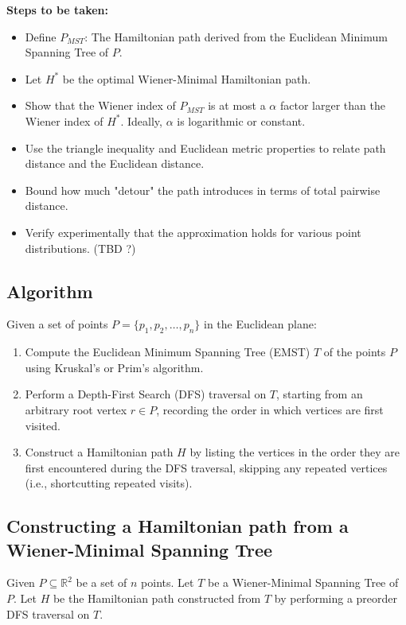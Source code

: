 \documentclass{article}
\begin{document}
\textbf{Steps to be taken:}
\begin{itemize}
	\item Define $P_{MST}$: The Hamiltonian path derived from the Euclidean Minimum Spanning Tree of $P$.
	\item Let $H^*$ be the optimal Wiener-Minimal Hamiltonian path.
	\item Show that the Wiener index of $P_{MST}$ is at most a $\alpha$ factor larger than the Wiener index of $H^*$. Ideally, $\alpha$ is logarithmic or constant.
	\item Use the triangle inequality and Euclidean metric properties to relate path distance and the Euclidean distance.
	\item Bound how much "detour" the path introduces in terms of total pairwise distance.
	\item Verify experimentally that the approximation holds for various point distributions. (TBD ?)
\end{itemize}


\subsection*{Algorithm}

Given a set of points \(P = \{p_1, p_2, \dots, p_n\}\) in the Euclidean plane:

\begin{enumerate}
	\item Compute the Euclidean Minimum Spanning Tree (EMST) \(T\) of the points \(P\) using Kruskal's or Prim's algorithm.
	\item Perform a Depth-First Search (DFS) traversal on \(T\), starting from an arbitrary root vertex \(r \in P\), recording the order in which vertices are first visited.
	\item Construct a Hamiltonian path \(H\) by listing the vertices in the order they are first encountered during the DFS traversal, skipping any repeated vertices (i.e., shortcutting repeated visits).
\end{enumerate}

\subsection*{Constructing a Hamiltonian path from a Wiener-Minimal Spanning Tree}

Given $P \subseteq \mathbb{R}^2$ be a set of $n$ points. Let $T$ be a Wiener-Minimal Spanning Tree of $P$. Let $H$ be the Hamiltonian path constructed from $T$ by performing a preorder DFS traversal on $T$.
\end{document}
